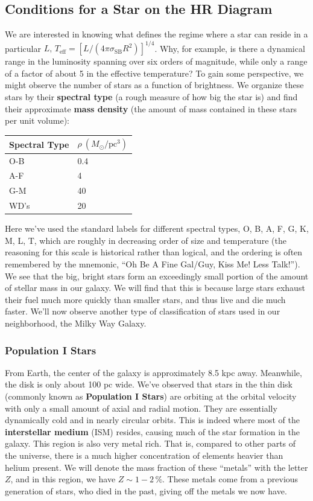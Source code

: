 \documentclass[10pt]{article}
\numberwithin{equation}{section}
\begin{document}
	\subsection{Conditions for a Star on the HR Diagram}
	We are interested in knowing what defines the regime where a star can reside in a particular $L,\,T_{\mathrm{eff}}=[L/(4\pi\sigma_{\mathrm{SB}}R^2)]^{1/4}$. Why, for example, is there a dynamical range in the luminosity spanning over six orders of magnitude, while only a range of a factor of about 5 in the effective temperature? To gain some perspective, we might observe the number of stars as a function of brightness. We organize these stars by their \textbf{spectral type} (a rough measure of how big the star is) and find their approximate \textbf{mass density} (the amount of mass contained in these stars per unit volume):
	\begin{center} 
	\begin{tabular}{l l}
		Spectral Type & $\rho\ (M_\odot/\mathrm{pc^3})$\\
		\hline
		O-B & 0.4\\
		A-F & 4\\
		G-M & 40\\
		WD's & 20
	\end{tabular}
	\end{center}
	Here we've used the standard labels for different spectral types, O, B, A, F, G, K, M, L, T, which are roughly in decreasing order of size and temperature (the reasoning for this scale is historical rather than logical, and the ordering is often remembered by the mnemonic, ``Oh Be A Fine Gal/Guy, Kiss Me! Less Talk!''). We see that the big, bright stars form an exceedingly small portion of the amount of stellar mass in our galaxy. We will find that this is because large stars exhaust their fuel much more quickly than smaller stars, and thus live and die much faster. We'll now observe another type of classification of stars used in our neighborhood, the Milky Way Galaxy.
		
	\subsubsection{Population I Stars}
	From Earth, the center of the galaxy is approximately 8.5 kpc away. Meanwhile, the disk is only about 100 pc wide.  We've observed that stars in the thin disk (commonly known as \textbf{Population I Stars}) are orbiting at the orbital velocity with only a small amount of axial and radial motion. They are essentially dynamically cold and in nearly circular orbits. This is indeed where most of the \textbf{interstellar medium} (ISM) resides, causing much of the star formation in the galaxy. This region is also very metal rich. That is, compared to other parts of the universe, there is a much higher concentration of elements heavier than helium present. We will denote the mass fraction of these ``metals'' with the letter $Z$, and in this region, we have $Z\sim 1-2\,\%$. These metals come from a previous generation of stars, who died in the past, giving off the metals we now have.	
	
\end{document}
